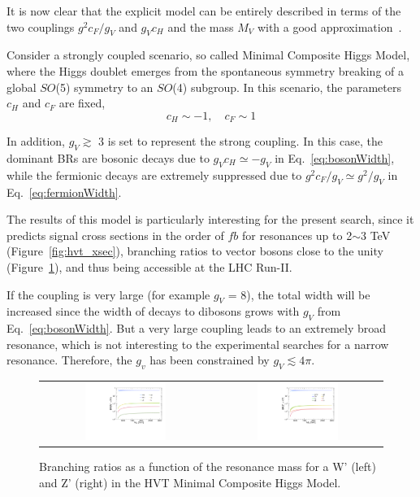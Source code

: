 It is now clear that the explicit model can be entirely described in terms of the two couplings $g^2c_F/g_V$ and $g_Vc_H$ and the mass $M_V$ with a good approximation~\cite{Pappadopulo:2014qza}.

Consider a strongly coupled scenario, so called Minimal Composite Higgs Model, where the Higgs doublet emerges from the spontaneous symmetry breaking of a global $SO$(5) symmetry to an $SO$(4) subgroup. In this scenario, the parameters $c_H$ and $c_F$ are fixed, \[c_H \sim -1, \quad c_F \sim 1\]

In addition, $g_V \gtrsim$ 3 is set to represent the strong coupling. In this case, the dominant BRs are bosonic decays due to $g_Vc_H \simeq -g_V$ in Eq.~\ref{eq:bosonWidth}, while the fermionic decays are extremely suppressed due to $g^2c_F/g_V \simeq g^2/g_V$ in Eq.~\ref{eq:fermionWidth}.

The results of this model is particularly interesting for the present search, since it predicts signal cross sections in the order of $fb$ for resonances up to 2$\sim$3 TeV (Figure~\ref{fig:hvt_xsec}), branching ratios to vector bosons close to the unity (Figure~\ref{fig:hvt_brs}), and thus being accessible at the LHC Run-II.

If the coupling is very large (for example $g_V$ = 8), the total width will be increased since the width of decays to dibosons grows with $g_V$ from Eq.~\ref{eq:bosonWidth}. But a very large coupling leads to an extremely broad resonance, which is not interesting to the experimental searches for a narrow resonance. Therefore, the $g_v$ has been constrained by $g_V \lesssim 4\pi$.

\begin{figure}[t]
  \centering
  \begin{tabular}{cc}
    \includegraphics[width=0.5\textwidth]{Figures/hvt-wp-brs.pdf} &
    \includegraphics[width=0.5\textwidth]{Figures/hvt-zp-brs.pdf} \\
  \end{tabular}
  \caption{Branching ratios as a function of the resonance mass for a W' (left) and Z' (right) in the HVT Minimal Composite Higgs Model.}
  \label{fig:hvt_brs}
\end{figure}
